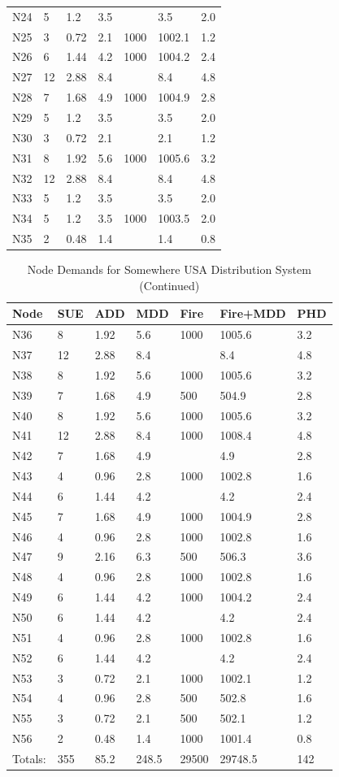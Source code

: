 \documentclass[12pt]{article}
\begin{document}
\begin{enumerate}
\begin{table}[h!]
\begin{tabular}{p{0.5in}p{0.7in}p{0.7in}p{0.7in}p{0.7in}p{0.8in}p{0.7in}}
N24&5&1.2&3.5&&3.5&2.0\\
N25&3&0.72&2.1&1000&1002.1&1.2\\
N26&6&1.44&4.2&1000&1004.2&2.4\\
N27&12&2.88&8.4&&8.4&4.8\\
N28&7&1.68&4.9&1000&1004.9&2.8\\
N29&5&1.2&3.5&&3.5&2.0\\
N30&3&0.72&2.1&&2.1&1.2\\
N31&8&1.92&5.6&1000&1005.6&3.2\\
N32&12&2.88&8.4&&8.4&4.8\\
N33&5&1.2&3.5&&3.5&2.0\\
N34&5&1.2&3.5&1000&1003.5&2.0\\
N35&2&0.48&1.4&&1.4&0.8\\
   \end{tabular}

   \label{tab:ByNodes}
\end{table}

\begin{table}[h!]
   \centering
   \caption{Node Demands for Somewhere USA Distribution System (Continued)}
   \begin{tabular}{p{0.5in}p{0.7in}p{0.7in}p{0.7in}p{0.7in}p{0.8in}p{0.7in}} %
Node & SUE & ADD & MDD & Fire & Fire+MDD & PHD \\
\hline
\hline
N36&8&1.92&5.6&1000&1005.6&3.2\\
N37&12&2.88&8.4&&8.4&4.8\\
N38&8&1.92&5.6&1000&1005.6&3.2\\
N39&7&1.68&4.9&500&504.9&2.8\\
N40&8&1.92&5.6&1000&1005.6&3.2\\
N41&12&2.88&8.4&1000&1008.4&4.8\\
N42&7&1.68&4.9&&4.9&2.8\\
N43&4&0.96&2.8&1000&1002.8&1.6\\
N44&6&1.44&4.2&&4.2&2.4\\
N45&7&1.68&4.9&1000&1004.9&2.8\\
N46&4&0.96&2.8&1000&1002.8&1.6\\
N47&9&2.16&6.3&500&506.3&3.6\\
N48&4&0.96&2.8&1000&1002.8&1.6\\
N49&6&1.44&4.2&1000&1004.2&2.4\\
N50&6&1.44&4.2&&4.2&2.4\\
N51&4&0.96&2.8&1000&1002.8&1.6\\
N52&6&1.44&4.2&&4.2&2.4\\
N53&3&0.72&2.1&1000&1002.1&1.2\\
N54&4&0.96&2.8&500&502.8&1.6\\
N55&3&0.72&2.1&500&502.1&1.2\\
N56&2&0.48&1.4&1000&1001.4&0.8\\
\hline
Totals:&355&85.2&248.5&29500&29748.5&142\\
\hline
   \end{tabular}


\end{table}
\end{enumerate}
\end{document}
